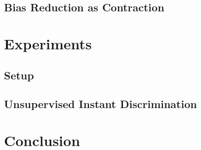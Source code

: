 \documentclass{article}
\begin{document}
\subsection{Bias Reduction as Contraction}

\section{Experiments}
\subsection{Setup}

\subsection{Unsupervised Instant Discrimination}

\section{Conclusion}

 
\small{}

% 
\end{document}
